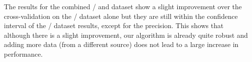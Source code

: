 \begin{subappendices}
The results for the combined / and  dataset show a slight improvement over the cross-validation on the / dataset alone but they are still within the confidence interval of the / dataset results, except for the precision.
This shows that although there is a slight improvement, our algorithm is already quite robust and adding more data (from a different source) does not lead to a large increase in performance.


\end{subappendices}
